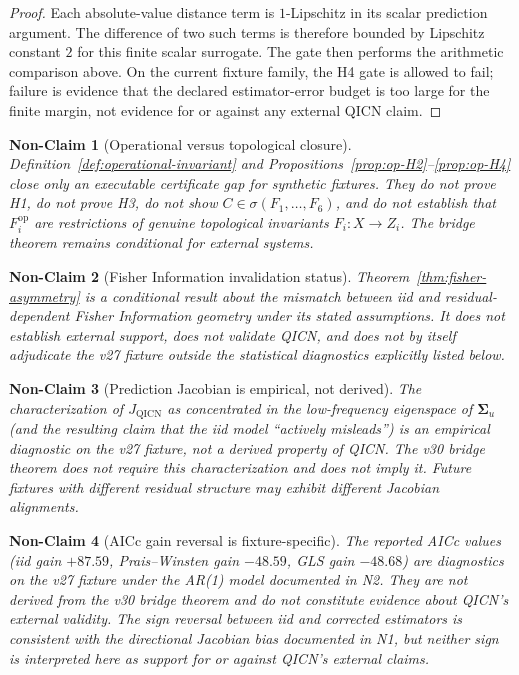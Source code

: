 \documentclass[11pt]{article}
\newtheorem{nonclaim}{Non-Claim}
\begin{document}
\begin{proof}
Each absolute-value distance term is $1$-Lipschitz in its scalar prediction argument. The difference of two such terms is therefore bounded by Lipschitz constant $2$ for this finite scalar surrogate. The gate then performs the arithmetic comparison above. On the current fixture family, the H4 gate is allowed to fail; failure is evidence that the declared estimator-error budget is too large for the finite margin, not evidence for or against any external QICN claim.
\end{proof}

\begin{nonclaim}[Operational versus topological closure]
Definition~\ref{def:operational-invariant} and Propositions~\ref{prop:op-H2}--\ref{prop:op-H4} close only an executable certificate gap for synthetic fixtures. They do not prove H1, do not prove H3, do not show $C\in\sigma(F_1,\ldots,F_6)$, and do not establish that $F_i^{\mathrm{op}}$ are restrictions of genuine topological invariants $F_i\colon X\to Z_i$. The bridge theorem remains conditional for external systems.
\end{nonclaim}

\begin{nonclaim}[Fisher Information invalidation status]
Theorem~\ref{thm:fisher-asymmetry} is a conditional result about the mismatch between iid and residual-dependent Fisher Information geometry under its stated assumptions. It does not establish external support, does not validate QICN, and does not by itself adjudicate the v27 fixture outside the statistical diagnostics explicitly listed below.
\end{nonclaim}

\begin{nonclaim}[Prediction Jacobian is empirical, not derived]
The characterization of $J_{\mathrm{QICN}}$ as concentrated in the low-frequency eigenspace of $\bm{\Sigma}_u$ (and the resulting claim that the iid model ``actively mis\-leads'') is an empirical diagnostic on the v27 fixture, not a derived property of QICN. The v30 bridge theorem does not require this characterization and does not imply it. Future fixtures with different residual structure may exhibit different Jacobian alignments.
\end{nonclaim}

\begin{nonclaim}[AICc gain reversal is fixture-specific]
The reported AICc values (iid gain $+87.59$, Prais--Winsten gain $-48.59$, GLS gain $-48.68$) are diagnostics on the v27 fixture under the AR(1) model documented in N2. They are not derived from the v30 bridge theorem and do not constitute evidence about QICN's external validity. The sign reversal between iid and corrected estimators is consistent with the directional Jacobian bias documented in N1, but neither sign is interpreted here as support for or against QICN's external claims.
\end{nonclaim}
\end{document}
